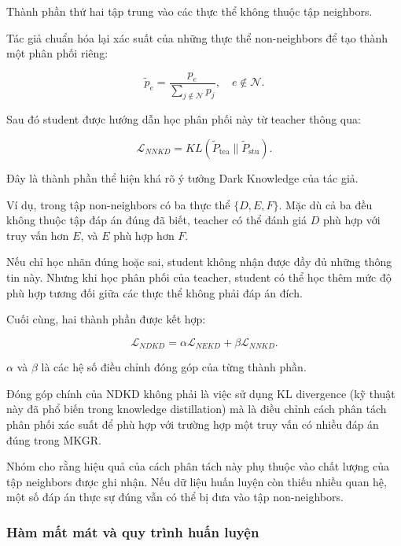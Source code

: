 Thành phần thứ hai tập trung vào các thực thể không thuộc tập neighbors.

Tác giả chuẩn hóa lại xác suất của những thực thể non-neighbors để tạo thành một phân phối riêng:

\begin{equation}
\tilde{p}_e=
\frac{p_e}
{\sum_{j\notin\mathcal{N}}p_j},
\quad e\notin\mathcal{N}.
\end{equation}

Sau đó student được hướng dẫn học phân phối này từ teacher thông qua:

\begin{equation}
\mathcal{L}_{NNKD}
=KL(\widetilde{P}_{\mathrm{tea}}
\|\widetilde{P}_{\mathrm{stu}}).
\end{equation}

Đây là thành phần thể hiện khá rõ
ý tưởng Dark Knowledge của tác giả.

Ví dụ, trong tập non-neighbors có ba thực thể
$\{D,E,F\}$. Mặc dù cả ba đều không thuộc
tập đáp án đúng đã biết, teacher có thể đánh
giá $D$ phù hợp với truy vấn hơn $E$, và $E$
phù hợp hơn $F$.

Nếu chỉ học nhãn đúng hoặc sai, student không
nhận được đầy đủ những thông tin này. Nhưng
khi học phân phối của teacher, student có thể
học thêm mức độ phù hợp tương đối giữa các
thực thể không phải đáp án đích.



Cuối cùng, hai thành phần được kết hợp:

\begin{equation}
\mathcal{L}_{NDKD}
=\alpha\mathcal{L}_{NEKD}
+\beta\mathcal{L}_{NNKD}.
\end{equation}

$\alpha$ và $\beta$ là các hệ số điều chỉnh đóng góp của từng thành phần.

Đóng góp chính của NDKD không phải là việc sử dụng KL divergence (kỹ
thuật này đã phổ biến trong knowledge distillation) mà là điều chỉnh
cách phân tách phân phối xác suất để phù hợp
với trường hợp một truy vấn có nhiều đáp án
đúng trong MKGR.

Nhóm cho rằng hiệu quả của
cách phân tách này phụ thuộc vào chất lượng
của tập neighbors được ghi nhận. Nếu dữ liệu
huấn luyện còn thiếu nhiều quan hệ, một số
đáp án thực sự đúng vẫn có thể bị đưa vào
tập non-neighbors.

\subsubsection{Hàm mất mát và quy trình huấn luyện}

